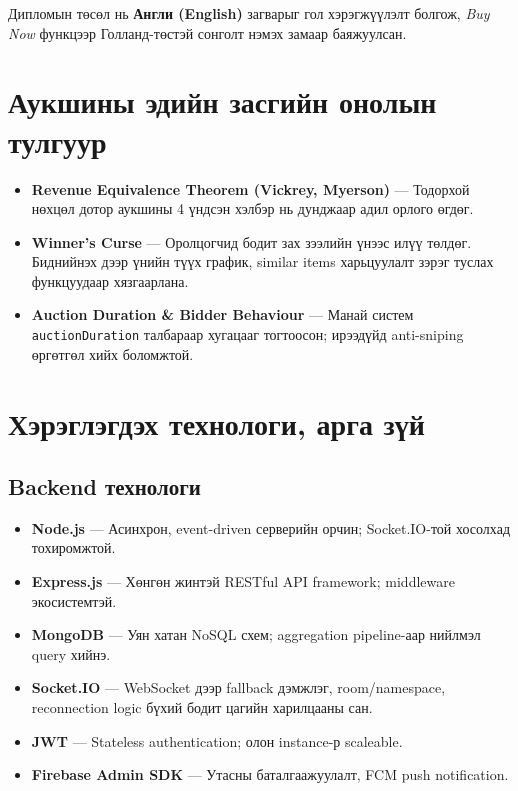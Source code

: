 \documentclass[12pt, a4paper]{report}
\begin{document}
Дипломын төсөл нь \textbf{Англи (English)} загварыг гол хэрэгжүүлэлт болгож, \textit{Buy Now} функцээр Голланд-төстэй сонголт нэмэх замаар баяжуулсан.

\section{Аукшины эдийн засгийн онолын тулгуур}

\begin{itemize}
  \item \textbf{Revenue Equivalence Theorem (Vickrey, Myerson)} — Тодорхой нөхцөл дотор аукшины 4 үндсэн хэлбэр нь дунджаар адил орлого өгдөг.
  \item \textbf{Winner's Curse} — Оролцогчид бодит зах зээлийн үнээс илүү төлдөг. Биднийнэх дээр үнийн түүх график, similar items харьцуулалт зэрэг туслах функцуудаар хязгаарлана.
  \item \textbf{Auction Duration \& Bidder Behaviour} — Манай систем \texttt{auctionDuration} талбараар хугацааг тогтоосон; ирээдүйд anti-sniping өргөтгөл хийх боломжтой.
\end{itemize}

\section{Хэрэглэгдэх технологи, арга зүй}

\subsection{Backend технологи}

\begin{itemize}
  \item \textbf{Node.js} — Асинхрон, event-driven серверийн орчин; Socket.IO-той хосолхад тохиромжтой.
  \item \textbf{Express.js} — Хөнгөн жинтэй RESTful API framework; middleware экосистемтэй.
  \item \textbf{MongoDB} — Уян хатан NoSQL схем; aggregation pipeline-аар нийлмэл query хийнэ.
  \item \textbf{Socket.IO} — WebSocket дээр fallback дэмжлэг, room/namespace, reconnection logic бүхий бодит цагийн харилцааны сан.
  \item \textbf{JWT} — Stateless authentication; олон instance-р scaleable.
  \item \textbf{Firebase Admin SDK} — Утасны баталгаажуулалт, FCM push notification.
\end{itemize}
\end{document}
